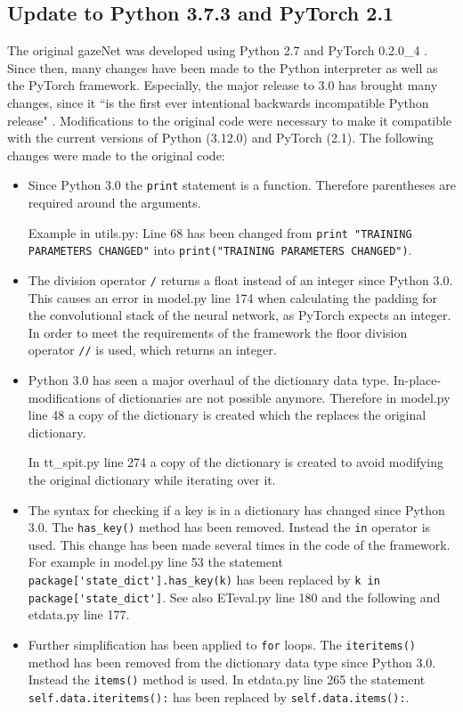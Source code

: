 \documentclass[conference]{IEEEtran}
\begin{document}
\subsection{Update to Python 3.7.3 and PyTorch 2.1}
The original gazeNet was developed using Python 2.7 and PyTorch 0.2.0\_4 \cite{zemblys2018gazeNet}. Since then, many changes have been made to the Python interpreter as well as the PyTorch framework. Especially, the major release to 3.0 has brought many changes, since it ``is the first ever intentional backwards incompatible Python release" \cite{van_Rossum_2009}. Modifications to the original code were necessary to make it compatible with the current versions of Python (3.12.0) and PyTorch (2.1). The following changes were made to the original code:

\begin{itemize}
    \item Since Python 3.0 the \verb|print| statement is a function. Therefore parentheses are required around the arguments. \cite{van_Rossum_2009}
    
    Example in utils.py: Line 68 has been changed from \verb|print "TRAINING PARAMETERS CHANGED"| into \verb|print("TRAINING PARAMETERS CHANGED")|.

    \item The division operator \verb|/| returns a float instead of an integer since Python 3.0. This causes an error in model.py line 174 when calculating the padding for the convolutional stack of the neural network, as PyTorch expects an integer. \cite{Contributors_2023} In order to meet the requirements of the framework the floor division operator \verb|//| is used, which returns an integer. \cite{van_Rossum_2009}
    
    \item Python 3.0 has seen a major overhaul of the dictionary data type. In-place-modifications of dictionaries are not possible anymore. Therefore in model.py line 48 a copy of the dictionary is created which the replaces the original dictionary.
    
    In tt\_spit.py line 274 a copy of the dictionary is created to avoid modifying the original dictionary while iterating over it.
    \cite{van_Rossum_2009}
    
    \item The syntax for checking if a key is in a dictionary has changed since Python 3.0. The \verb|has_key()| method has been removed. Instead the \verb|in| operator is used. This change has been made several times in the code of the framework. For example in model.py line 53 the statement \verb|package['state_dict'].has_key(k)| has been replaced by \verb|k in package['state_dict']|. See also ETeval.py line 180 and the following and etdata.py line 177.
    \cite{van_Rossum_2009}

    \item Further simplification has been applied to \verb|for| loops. The \verb|iteritems()| method has been removed from the dictionary data type since Python 3.0. Instead the \verb|items()| method is used. In etdata.py line 265 the statement \verb|self.data.iteritems():| has been replaced by \verb|self.data.items():|.
    
\end{itemize}
\end{document}
